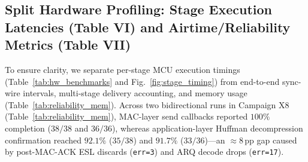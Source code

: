 \documentclass[conference]{IEEEtran}
\begin{document}
\subsection{Split Hardware Profiling: Stage Execution Latencies (Table VI) and Airtime/Reliability Metrics (Table VII)}
To ensure clarity, we separate per-stage MCU execution timings (Table~\ref{tab:hw_benchmarks} and Fig.~\ref{fig:stage_timing}) from end-to-end sync-wire intervals, multi-stage delivery accounting, and memory usage (Table~\ref{tab:reliability_mem}). Across two bidirectional runs in Campaign X8 (Table~\ref{tab:reliability_mem}), MAC-layer send callbacks reported $100\%$ completion ($38/38$ and $36/36$), whereas application-layer Huffman decompression confirmation reached $92.1\%$ ($35/38$) and $91.7\%$ ($33/36$)---an $\approx 8$\,pp gap caused by post-MAC-ACK ESL discards (\texttt{err=3}) and ARQ decode drops (\texttt{err=17}).
\end{document}
